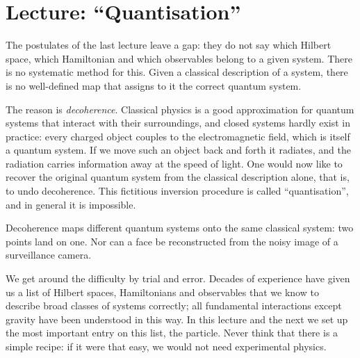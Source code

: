 \section{Lecture: ``Quantisation''}
The postulates of the last lecture leave a gap: they do not say which Hilbert space, which Hamiltonian and which observables belong to a given system. There is no systematic method for this. Given a classical description of a system, there is no well-defined map that assigns to it the correct quantum system.

The reason is \emph{decoherence}. Classical physics is a good approximation for quantum systems that interact with their surroundings, and closed systems hardly exist in practice: every charged object couples to the electromagnetic field, which is itself a quantum system. If we move such an object back and forth it radiates, and the radiation carries information away at the speed of light. One would now like to recover the original quantum system from the classical description alone, that is, to undo decoherence. This fictitious inversion procedure is called ``quantisation'', and in general it is impossible.

\begin{greybox}
	Decoherence maps different quantum systems onto the same classical system: two points land on one. Nor can a face be reconstructed from the noisy image of a surveillance camera.
\end{greybox}

We get around the difficulty by trial and error. Decades of experience have given us a list of Hilbert spaces, Hamiltonians and observables that we know to describe broad classes of systems correctly; all fundamental interactions except gravity have been understood in this way. In this lecture and the next we set up the most important entry on this list, the particle. Never think that there is a simple recipe: if it were that easy, we would not need experimental physics.

